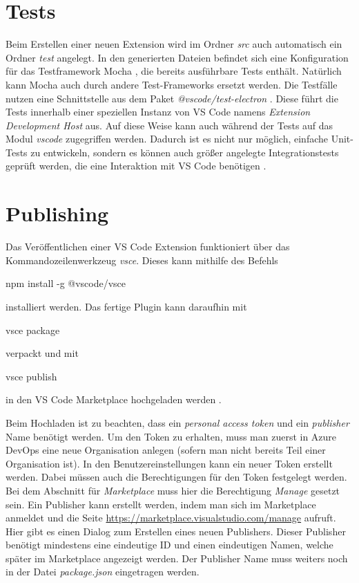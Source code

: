 \section{Tests}
\label{sec:EntwicklungVsCode_Tests}

Beim Erstellen einer neuen Extension wird im Ordner \emph{src} 
auch automatisch ein Ordner \emph{test} angelegt. 
In den generierten Dateien befindet sich 
eine Konfiguration für das Test\-framework Mocha \cite{MochaJSWebsite}, 
die bereits ausführbare Tests enthält. Natürlich
kann Mocha auch durch andere Test-Frameworks ersetzt werden. 
Die Testfälle nutzen eine Schnittstelle
aus dem Paket \emph{@vscode/test-electron} \cite{VSCodeTestElectronGithub}. 
Diese führt die Tests
innerhalb einer speziellen Instanz von VS Code namens 
\emph{Extension Development Host} aus. Auf diese Weise kann auch
während der Tests auf das Modul \emph{vscode} zugegriffen werden.
Dadurch ist es nicht nur möglich, einfache Unit-Tests zu entwickeln, 
sondern es können auch größer angelegte Integrationstests
geprüft werden, die eine Interaktion mit VS Code benötigen 
\cite{VSCodeExtensionAPITestingExtensions}.

\section{Publishing}
\label{sec:EntwicklungVsCode_Publishing}

Das Veröffentlichen einer VS Code Extension funktioniert über das 
Kommandozeilenwerkzeug \emph{vsce}. Dieses kann mithilfe des Befehls
\begin{GenericCode}[numbers=none]
npm install -g @vscode/vsce
\end{GenericCode}
installiert werden. Das fertige Plugin kann daraufhin mit 
\begin{GenericCode}[numbers=none]
vsce package
\end{GenericCode}
verpackt und mit 
\begin{GenericCode}[numbers=none]
vsce publish
\end{GenericCode}
in den VS Code Marketplace hochgeladen werden \cite{VSCodeExtensionAPIPublishingExtension}.

Beim Hochladen ist zu beachten, dass ein \emph{personal access token}
und ein \emph{publisher} Name benötigt werden.
Um den Token zu erhalten, muss man zuerst in Azure DevOps eine neue Organisation
anlegen (sofern man nicht bereits Teil einer Organisation ist). In den 
Benutzereinstellungen kann ein neuer Token erstellt werden. Dabei müssen auch die 
Berechtigungen für den Token festgelegt werden. Bei dem Abschnitt für 
\emph{Marketplace} muss hier die Berechtigung \emph{Manage} gesetzt sein.
Ein Publisher kann erstellt werden, indem man sich im Marketplace anmeldet
und die Seite \url{https://marketplace.visualstudio.com/manage} aufruft.
Hier gibt es einen Dialog zum Erstellen eines neuen Publishers. Dieser
Publisher benötigt mindestens eine eindeutige ID und einen eindeutigen
Namen, welche später im Marketplace angezeigt werden. Der Publisher Name
muss weiters noch in der Datei \emph{package.json} eingetragen werden.

